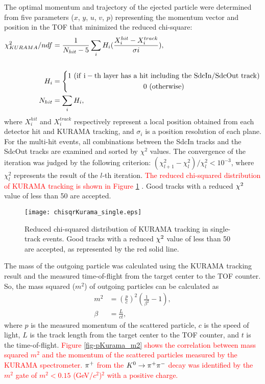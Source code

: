 The optimal momentum and trajectory of the ejected particle were determined from five parameters ($x$, $y$, $u$, $v$, $p$) representing the momentum vector and position in the TOF that minimized the reduced chi-square:
\begin{align}
  \chi^{2}_{KURAMA}/ndf &= \frac{1}{N_{hit}-5}\sum_{i}H_{i}(\frac{X^{hit}_{i} - X^{track}_{i}}{\sigma{i}}), \\
    \nonumber \\
  H_i &= \left\{ 
    \begin{gathered}
  	1\ ({\rm if\ i-th\ layer\ has\ a\ hit\ including\ the\ SdcIn/SdcOut\ track}) \\ 
	0\ ({\rm otherwise}) 
    \end{gathered}
    \right. \nonumber \\
  N_{hit} &= \sum_{i}H_{i}, \nonumber 
\end{align}
where $X^{hit}_{i}$ and $X^{track}_{i}$ respectively represent a local position obtained from each detector hit and KURAMA tracking, and $\sigma_{i}$ is a position resolution of each plane. For the multi-hit events, all combinations between the SdcIn tracks and the SdcOut tracks are examined and sorted by $\chi^{2}$ values. The convergence of the iteration was judged by the following criterion: $(\chi^{2}_{l+1} - \chi^{2}_{l})/\chi^{2}_{l} < 10^{-3}$, where $\chi^{2}_{l}$ represents the result of the $l$-th iteration. \textcolor{red}{ The reduced chi-squared distribution of KURAMA tracking is shown in Figure \ref{fig-chisqrKurama} }. Good tracks with a reduced $\chi^{2}$ value of less than 50 are accepted.

\begin{figure}[!h]
  \begin{center}
    \texttt{[image: chisqrKurama\_single.eps]}
    \caption{Reduced chi-squared distribution of KURAMA tracking in single-track events. Good tracks with a reduced $\chi^{2}$ value of less than 50 are accepted, as represented by the red solid line.}
    \label{fig-chisqrKurama}
  \end{center}
\end{figure}

The mass of the outgoing particle was calculated using the KURAMA tracking result and the measured time-of-flight from the target center to the TOF counter. So, the mass squared ($m^{2}$) of outgoing particles can be calculated as
\begin{align}
  m^2 &= \left( \frac{p}{c} \right)^{2} \left( \frac{1}{\beta^{2}} - 1\right), \\
  \beta &= \frac{L}{ct},
\end{align}
where 
$p$ is the measured momentum of the scattered particle, $c$ is the speed of light, $L$ is the track length from the target center to the TOF counter, and $t$ is the time-of-flight. \textcolor{red}{ Figure \ref{fig-pKurama_m2} shows the correlation between mass squared $m^{2}$ and the momentum of the scattered particles measured by the KURAMA spectrometer. $\pi^{+}$ from the $K^0 \to \pi^+ \pi^-$ decay was identified by the $m^{2}$ gate of $m^{2}<0.15$ (GeV/$c^{2}$)$^{2}$ with a positive charge. }

